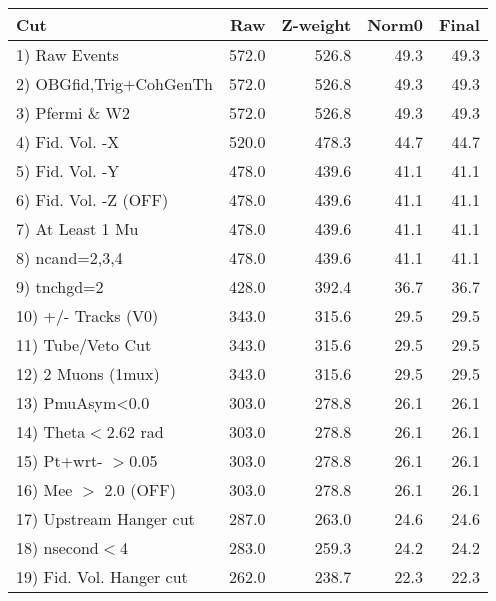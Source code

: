  \begin{table}[h!]\centering
 \begin{tabular}{||l||r|r|r|r||}
 \hline
 \hline
 Cut & Raw & Z-weight & Norm0 & Final \\
 \hline
  1) Raw Events           &       572.0 &       526.8 &        49.3 &        49.3 \\
  2) OBGfid,Trig+CohGenTh &       572.0 &       526.8 &        49.3 &        49.3 \\
  3) Pfermi \& W2         &       572.0 &       526.8 &        49.3 &        49.3 \\
  4) Fid. Vol. -X         &       520.0 &       478.3 &        44.7 &        44.7 \\
  5) Fid. Vol. -Y         &       478.0 &       439.6 &        41.1 &        41.1 \\
  6) Fid. Vol. -Z (OFF)   &       478.0 &       439.6 &        41.1 &        41.1 \\
  7) At Least 1 Mu        &       478.0 &       439.6 &        41.1 &        41.1 \\
  8) ncand=2,3,4          &       478.0 &       439.6 &        41.1 &        41.1 \\
  9) tnchgd=2             &       428.0 &       392.4 &        36.7 &        36.7 \\
 10) +/- Tracks (V0)      &       343.0 &       315.6 &        29.5 &        29.5 \\
 11) Tube/Veto Cut        &       343.0 &       315.6 &        29.5 &        29.5 \\
 12) 2 Muons (1mux)       &       343.0 &       315.6 &        29.5 &        29.5 \\
 13) PmuAsym<0.0          &       303.0 &       278.8 &        26.1 &        26.1 \\
 14) Theta$<$2.62 rad     &       303.0 &       278.8 &        26.1 &        26.1 \\
 15) Pt+wrt- $>$0.05      &       303.0 &       278.8 &        26.1 &        26.1 \\
 16) Mee $>$ 2.0  (OFF)   &       303.0 &       278.8 &        26.1 &        26.1 \\
 17) Upstream Hanger cut  &       287.0 &       263.0 &        24.6 &        24.6 \\
 18) nsecond$<$4          &       283.0 &       259.3 &        24.2 &        24.2 \\
 19) Fid. Vol. Hanger cut &       262.0 &       238.7 &        22.3 &        22.3 \\

\end{tabular}
\end{table}
